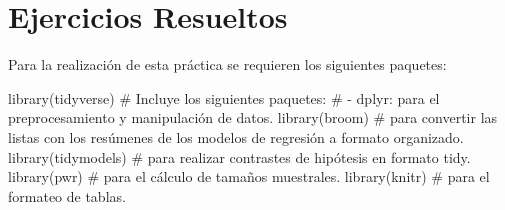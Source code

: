 \documentclass[
  a4paper,
]{scrreport}
\newenvironment{Shaded}{\begin{snugshade}}{\end{snugshade}}
\newcommand{\CommentTok}[1]{\textcolor[rgb]{0.37,0.37,0.37}{#1}}
\newcommand{\FunctionTok}[1]{\textcolor[rgb]{0.28,0.35,0.67}{#1}}
\newcommand{\NormalTok}[1]{\textcolor[rgb]{0.00,0.23,0.31}{#1}}
\theoremstyle{definition}
\theoremstyle{remark}
\begin{document}
\hypertarget{ejercicios-resueltos-8}{%
\section{Ejercicios Resueltos}\label{ejercicios-resueltos-8}}

Para la realización de esta práctica se requieren los siguientes
paquetes:

\begin{Shaded}
\begin{Highlighting}[]
\FunctionTok{library}\NormalTok{(tidyverse)}
\CommentTok{\# Incluye los siguientes paquetes:}
\CommentTok{\# {-} dplyr: para el preprocesamiento y manipulación de datos.}
\FunctionTok{library}\NormalTok{(broom) }\CommentTok{\# para convertir las listas con los resúmenes de los modelos de regresión a formato organizado.}
\FunctionTok{library}\NormalTok{(tidymodels) }\CommentTok{\# para realizar contrastes de hipótesis en formato tidy.}
\FunctionTok{library}\NormalTok{(pwr) }\CommentTok{\# para el cálculo de tamaños muestrales.}
\FunctionTok{library}\NormalTok{(knitr) }\CommentTok{\# para el formateo de tablas.}
\end{Highlighting}
\end{Shaded}
\end{document}
